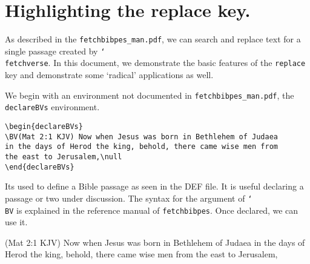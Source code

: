 \documentclass{article}
\providecommand\cs[1]{\texttt{\char`\\#1}}
\let\pkg\texttt
\begin{document}
\section{Highlighting the replace key.}

As described in the \texttt{fetchbibpes\_man.pdf}, we can search and replace
text for a single passage created by \cs{fetchverse}. In this document, we
demonstrate the basic features of the \texttt{replace} key and demonstrate
some `radical' applications as well.

We begin with an environment not documented in \texttt{fetchbibpes\_man.pdf},
the \texttt{declareBVs} environment.
\begin{verbatim}
\begin{declareBVs}
\BV(Mat 2:1 KJV) Now when Jesus was born in Bethlehem of Judaea
in the days of Herod the king, behold, there came wise men from
the east to Jerusalem,\null
\end{declareBVs}
\end{verbatim}
Its used to define a Bible passage as seen in the DEF file. It is useful
declaring a passage or two under discussion. The syntax for the argument of
\cs{BV} is explained in the reference manual of \pkg{fetchbibpes}. Once
declared, we can use it.
\begin{declareBVs}
\BV(Mat 2:1 KJV) Now when Jesus was born in Bethlehem of Judaea in the days
of Herod the king, behold, there came wise men from the east to Jerusalem,\null
\end{declareBVs}
\end{document}
